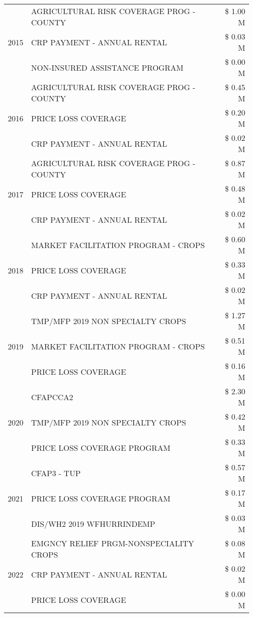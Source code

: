 \begin{tabular}{llr}
\cline{1-3}
\multirow[t]{3}{*}{2015} & AGRICULTURAL RISK COVERAGE PROG - COUNTY & \$ 1.00 M \\
 & CRP PAYMENT - ANNUAL RENTAL & \$ 0.03 M \\
 & NON-INSURED ASSISTANCE PROGRAM & \$ 0.00 M \\
\cline{1-3}
\multirow[t]{3}{*}{2016} & AGRICULTURAL RISK COVERAGE PROG - COUNTY & \$ 0.45 M \\
 & PRICE LOSS COVERAGE & \$ 0.20 M \\
 & CRP PAYMENT - ANNUAL RENTAL & \$ 0.02 M \\
\cline{1-3}
\multirow[t]{3}{*}{2017} & AGRICULTURAL RISK COVERAGE PROG - COUNTY & \$ 0.87 M \\
 & PRICE LOSS COVERAGE & \$ 0.48 M \\
 & CRP PAYMENT - ANNUAL RENTAL & \$ 0.02 M \\
\cline{1-3}
\multirow[t]{3}{*}{2018} & MARKET FACILITATION PROGRAM - CROPS & \$ 0.60 M \\
 & PRICE LOSS COVERAGE & \$ 0.33 M \\
 & CRP PAYMENT - ANNUAL RENTAL & \$ 0.02 M \\
\cline{1-3}
\multirow[t]{3}{*}{2019} & TMP/MFP 2019 NON SPECIALTY CROPS & \$ 1.27 M \\
 & MARKET FACILITATION PROGRAM - CROPS & \$ 0.51 M \\
 & PRICE LOSS COVERAGE & \$ 0.16 M \\
\cline{1-3}
\multirow[t]{3}{*}{2020} & CFAPCCA2 & \$ 2.30 M \\
 & TMP/MFP 2019 NON SPECIALTY CROPS & \$ 0.42 M \\
 & PRICE LOSS COVERAGE PROGRAM & \$ 0.33 M \\
\cline{1-3}
\multirow[t]{3}{*}{2021} & CFAP3 - TUP & \$ 0.57 M \\
 & PRICE LOSS COVERAGE PROGRAM & \$ 0.17 M \\
 & DIS/WH2 2019 WFHURRINDEMP & \$ 0.03 M \\
\cline{1-3}
\multirow[t]{3}{*}{2022} & EMGNCY RELIEF PRGM-NONSPECIALITY CROPS & \$ 0.08 M \\
 & CRP PAYMENT - ANNUAL RENTAL & \$ 0.02 M \\
 & PRICE LOSS COVERAGE & \$ 0.00 M \\
\cline{1-3}
\bottomrule
\end{tabular}

